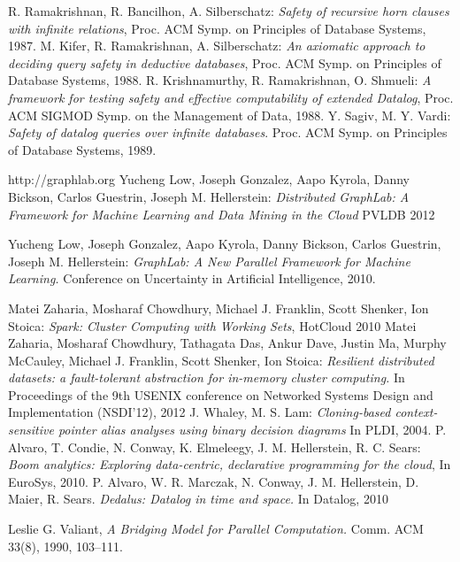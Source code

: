 \begin{thebibliography}{99}
 R. Ramakrishnan, R. Bancilhon, A. Silberschatz:  \textit{Safety of recursive horn clauses with infinite relations}, Proc. ACM Symp. on Principles of Database Systems, 1987.
 M. Kifer, R. Ramakrishnan, A. Silberschatz:  \textit{An axiomatic approach to deciding query safety in deductive databases}, Proc. ACM Symp. on Principles of Database Systems, 1988.
 R. Krishnamurthy, R. Ramakrishnan, O. Shmueli:  \textit{A framework for testing safety and effective computability of extended Datalog}, Proc. ACM SIGMOD Symp. on the Management of Data, 1988.
 Y. Sagiv, M. Y. Vardi:  \textit{Safety of datalog queries over infinite databases}.  Proc. ACM Symp. on Principles of Database Systems, 1989.

 http://graphlab.org
 Yucheng Low, Joseph Gonzalez, Aapo Kyrola, Danny Bickson, Carlos Guestrin, Joseph M. Hellerstein: \textit{Distributed GraphLab: A Framework for Machine Learning and Data Mining in the Cloud} PVLDB 2012	

 Yucheng Low, Joseph Gonzalez, Aapo Kyrola, Danny Bickson, Carlos Guestrin, Joseph M. Hellerstein: \textit{GraphLab: A New Parallel Framework for Machine Learning.} Conference on Uncertainty in Artificial Intelligence, 2010.

 Matei Zaharia, Mosharaf Chowdhury, Michael J. Franklin, Scott Shenker, Ion Stoica: \textit{Spark: Cluster Computing with Working Sets}, HotCloud 2010
 Matei Zaharia, Mosharaf Chowdhury, Tathagata Das, Ankur Dave, Justin Ma, Murphy McCauley, Michael J. Franklin, Scott Shenker, Ion Stoica: \textit{Resilient distributed datasets: a fault-tolerant abstraction for in-memory cluster computing.} In Proceedings of the 9th USENIX conference on Networked Systems Design and Implementation (NSDI'12), 2012
 J. Whaley, M. S. Lam: \textit{Cloning-based context-sensitive pointer alias analyses using binary decision diagrams} In PLDI, 2004.
 P. Alvaro, T. Condie, N. Conway, K. Elmeleegy, J. M. Hellerstein, R. C. Sears: \textit{Boom analytics: Exploring data-centric, declarative programming for the cloud}, In EuroSys, 2010.
 P. Alvaro, W. R. Marczak, N. Conway, J. M. Hellerstein, D. Maier, R. Sears. \textit{Dedalus: Datalog in time and space.} In Datalog, 2010

 Leslie G. Valiant, \emph{A Bridging Model for Parallel Computation.} Comm. ACM 33(8), 1990, 103–111.


\end{thebibliography}
